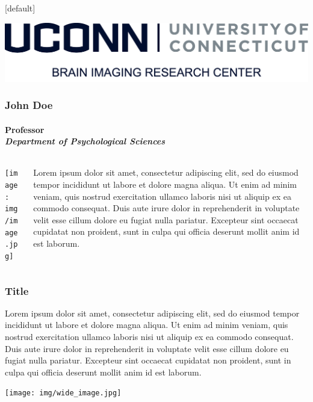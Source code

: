 \documentclass[aspectratio=169]{beamer}
\makeatletter
\newenvironment{withoutheadline}{
        \setbeamertemplate{headline}[default]
        \def\beamer@entrycode{\vspace*{-\headheight}}
    }{}
\makeatother
\begin{document}
\begin{withoutheadline}\begin{frame}

	\begin{center}
		\includegraphics[width=\textwidth]{img/logo.png}
	\end{center}
\end{frame}\end{withoutheadline}


\begin{frame}
	\frametitle{John Doe}
	\framesubtitle{Professor\\ \textit{Department of Psychological Sciences}}

	\begin{columns}[T]
		\begin{column}{.25\textwidth}
			\texttt{[image: img/image.jpg]}
		\end{column}

		\begin{column}{.75\textwidth}
			Lorem ipsum dolor sit amet, consectetur adipiscing elit, sed do eiusmod tempor incididunt ut labore et dolore magna aliqua. Ut enim ad minim veniam, quis nostrud exercitation ullamco laboris nisi ut aliquip ex ea commodo consequat. Duis aute irure dolor in reprehenderit in voluptate velit esse cillum dolore eu fugiat nulla pariatur. Excepteur sint occaecat cupidatat non proident, sunt in culpa qui officia deserunt mollit anim id est laborum.
		\end{column}
	\end{columns}
\end{frame}


\begin{frame}
	\frametitle{Title}

	Lorem ipsum dolor sit amet, consectetur adipiscing elit, sed do eiusmod tempor incididunt ut labore et dolore magna aliqua. Ut enim ad minim veniam, quis nostrud exercitation ullamco laboris nisi ut aliquip ex ea commodo consequat. Duis aute irure dolor in reprehenderit in voluptate velit esse cillum dolore eu fugiat nulla pariatur. Excepteur sint occaecat cupidatat non proident, sunt in culpa qui officia deserunt mollit anim id est laborum. 
	
	\begin{center}
		\texttt{[image: img/wide\_image.jpg]}
	\end{center}

\end{frame}
\end{document}
